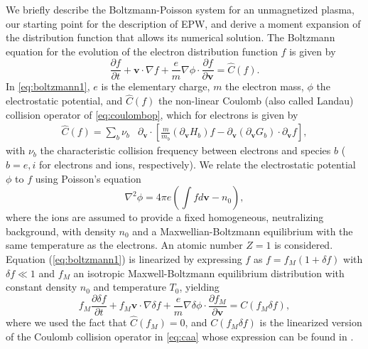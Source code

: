 We briefly describe the Boltzmann-Poisson system for an unmagnetized plasma, our starting point for the description of EPW, and derive a moment expansion of the distribution function that allows its {numerical} solution.
%
The Boltzmann equation for the evolution of the electron distribution function $f$ is given by
%
\begin{equation}
    \frac{\partial f}{\partial t} + \mathbf v \cdot \nabla f + \frac{e}{m}\nabla \phi \cdot \frac{\partial f}{\partial \mathbf v} = \hat C(f).
\label{eq:boltzmann1}
\end{equation}
%
In \cref{eq:boltzmann1}, $e$ is the elementary charge, $m$ the electron mass, $\phi$ the electrostatic potential, and $\hat  C(f)$ the non-linear Coulomb {(also called Landau)} collision operator of \cref{eq:coulombop}, which for electrons is given by
%
\begin{equation}
    \begin{split}
        \hat C(f)=\sum_b{\nu_{b}}&\partial_{\mathbf v} \cdot \left[\frac{m}{m_b}({\partial_{\mathbf v} H_b})f - \partial_{\mathbf v}(\partial_{\mathbf v}G_b)\cdot \partial_{\mathbf v}f\right],
    \end{split}
    \label{eq:caa}
\end{equation}
%
with $\nu_{b}$ the characteristic collision frequency between electrons and species $b$ ($b=e,i$ for electrons and ions, respectively).
%
We relate the electrostatic potential $\phi$ to $f$ using Poisson's equation
%
\begin{equation}
    \nabla^2 \phi = 4 \pi e \left(\int f d \mathbf v - n_0\right),
\end{equation}
%
where the ions are assumed to provide a fixed homogeneous, neutralizing background, with density $n_0$ and a Maxwellian-Boltzmann equilibrium with the same temperature as the electrons.
%
{An atomic number $Z=1$ is considered.}
%
Equation (\ref{eq:boltzmann1}) is linearized by expressing $f$ as $f=f_M(1+\delta f)$ with $\delta f \ll 1$ and $f_M$ an isotropic Maxwell-Boltzmann equilibrium distribution with constant density $n_0$ and temperature $T_0$, yielding
%
\begin{equation}
    f_M\frac{\partial \delta f}{\partial t} + f_M \mathbf v \cdot \nabla \delta f + \frac{e}{m}\nabla \delta \phi \cdot \frac{\partial f_M}{\partial \mathbf v} = C(f_M \delta f),
\label{eq:linboltzmann}
\end{equation}
%
where we used the fact that $\hat C(f_M)=0${, and $C(f_M \delta f)$ is the linearized version of the Coulomb collision operator in \cref{eq:caa} whose expression can be found in \citet{Helander2002}}.
